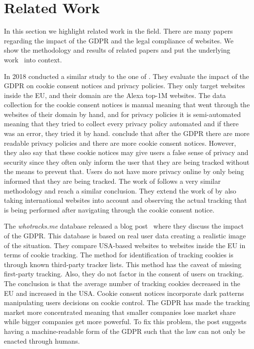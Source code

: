 \section{Related Work}
\label{sec:related}

In this section we highlight related work in the field. There are many papers regarding the impact of the GDPR and
the legal compliance of websites. We show the methodology and results of related papers and put the underlying
work~\cite{sanchez2019can} into context.

In 2018  conducted a similar study to the one of . They evaluate the impact of the
GDPR on cookie consent notices and privacy policies. They only target websites inside the EU, and their domain are the
Alexa top-1M websites. The data collection for the cookie consent notices is manual meaning that
\citeauthor{degeling2018we} went through the websites of their domain by hand, and for privacy policies it is
semi-automated meaning that they tried to collect every privacy policy automated and if there was an error, they tried
it by hand. \citeauthor{degeling2018we} conclude that after the GDPR there are more readable privacy policies
and there are more cookie consent notices. However, they also say that these cookie notices may give users a false sense
of privacy and security since they often only inform the user that they are being tracked without the means to prevent
that. Users do not have more privacy online by only being informed that they are being tracked. The work of
 follows a very similar methodology and reach a similar conclusion. They extend the work of
 by also taking international websites into account and observing the actual tracking that is being
performed after navigating through the cookie consent notice.

The \emph{whotracks.me} database released a blog post~\cite{whathappened} where they discuss the impact of the GDPR.
This database is based on real user data creating a realistic image of the situation. They compare USA-based websites to
websites inside the EU in terms of cookie tracking. The method for identification of tracking cookies is through known third-party
tracker lists. This method has the caveat of missing first-party tracking. Also, they do not factor in the consent of
users on tracking. The conclusion is that the average number of tracking cookies decreased in the EU and increased in
the USA. Cookie consent notices incorporate dark patterns manipulating users decisions on cookie control. The GDPR has
made the tracking market more concentrated meaning that smaller companies lose market share while bigger companies get
more powerful. To fix this problem, the post suggests having a machine-readable form of the GDPR such that the law can
not only be enacted through humans.

